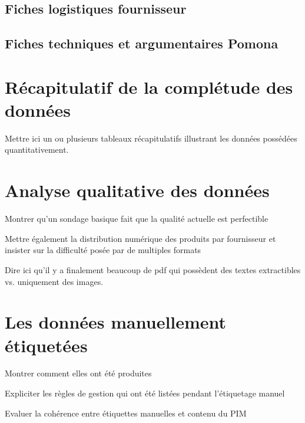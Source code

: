             \subsection{Fiches logistiques fournisseur}
            \subsection{Fiches techniques et argumentaires Pomona}
        \section{Récapitulatif de la complétude des données}

        Mettre ici un ou plusieurs tableaux récapitulatifs illustrant les données possédées quantitativement.

        \section{Analyse qualitative des données}
        
        Montrer qu'un sondage basique fait que la qualité actuelle est perfectible

        Mettre également la distribution numérique des produits par fournisseur et insister sur la difficulté posée par de multiples formats

        Dire ici qu'il y a finalement beaucoup de pdf qui possèdent des textes extractibles vs. uniquement des images.

        \section{Les données \og manuellement étiquetées \fg}

        Montrer comment elles ont été produites

        Expliciter les règles de gestion qui ont été listées pendant l'étiquetage manuel

        Evaluer la cohérence entre étiquettes manuelles et contenu du PIM
